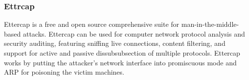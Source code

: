    \subsubsection{Ettrcap}
    Ettercap is a free and open source comprehensive suite for man-in-the-middle-based
attacks.
Ettercap can be used for computer network protocol analysis and security auditing,
featuring sniffing live connections, content filtering, and support for active and passive
dissubsubsection of multiple protocols. Ettercap works by putting the attacker's network
interface into promiscuous mode and ARP for poisoning the victim machines.

